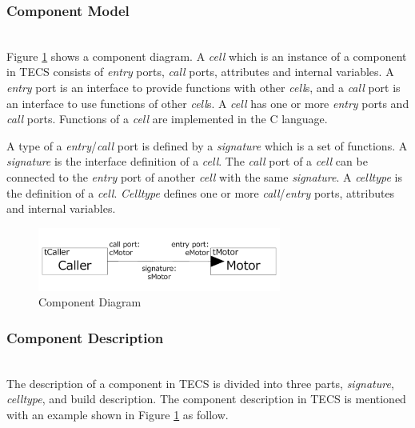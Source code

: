 \documentclass[conference,compsoc]{IEEEtran}
\begin{document}
\subsubsection{Component Model}\mbox{}\\

Figure \ref{fig:component} shows a component diagram.
A {\it cell} which is an instance of a component in TECS consists of {\it entry} ports, {\it call} ports, attributes and internal variables.
A {\it entry} port is an interface to provide functions with other {\it cell}s, and a {\it call} port is an interface to use functions of other {\it cell}s.
A {\it cell} has one or more {\it entry} ports and {\it call} ports.
Functions of a {\it cell} are implemented in the C language.

A type of a {\it entry}/{\it call} port is defined by a {\it signature} which is a set of functions.
A {\it signature} is the interface definition of a {\it cell}.
The {\it call} port of a {\it cell} can be connected to the {\it entry} port of another {\it cell} with the same {\it signature}.
A {\it celltype} is the definition of a {\it cell}.
{\it Celltype} defines one or more {\it call}/{\it entry} ports, attributes and internal variables.

\begin{figure}[t]
    \centering
    \includegraphics[width=8cm,clip]{figure/component_diagram.pdf}
    \caption{Component Diagram}
    \label{fig:component}
\end{figure}

\subsubsection{Component Description}\mbox{}\\

The description of a component in TECS is divided into three parts, {\it signature}, {\it celltype}, and build description.
The component description in TECS is mentioned with an example shown in Figure \ref{fig:component} as follow.
\end{document}
